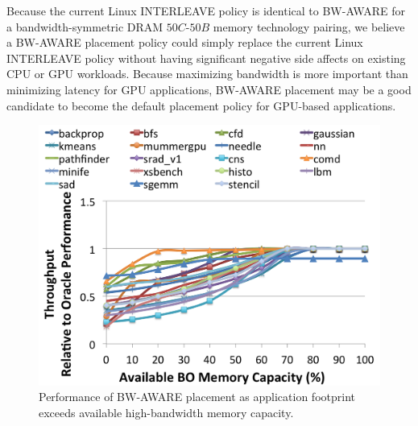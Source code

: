 
Because the current Linux INTERLEAVE policy is identical to BW-AWARE for a bandwidth-symmetric
DRAM $50C$-$50B$ memory technology pairing, we believe a BW-AWARE placement policy could simply
replace the current Linux INTERLEAVE policy without having significant negative side
affects on existing CPU or GPU workloads.  Because maximizing bandwidth is more important
than minimizing latency for GPU applications, BW-AWARE placement may be a good candidate
to become the default placement policy for GPU-based applications.

\begin{figure}[t]
    \centering
    \includegraphics[width=0.9\columnwidth]{asplos2015/figures/bwaware-capacity.png}
    \caption{Performance of BW-AWARE placement as application footprint exceeds
available high-bandwidth
    memory capacity.}
    \label{fig:capacityconstrained}
\end{figure}

